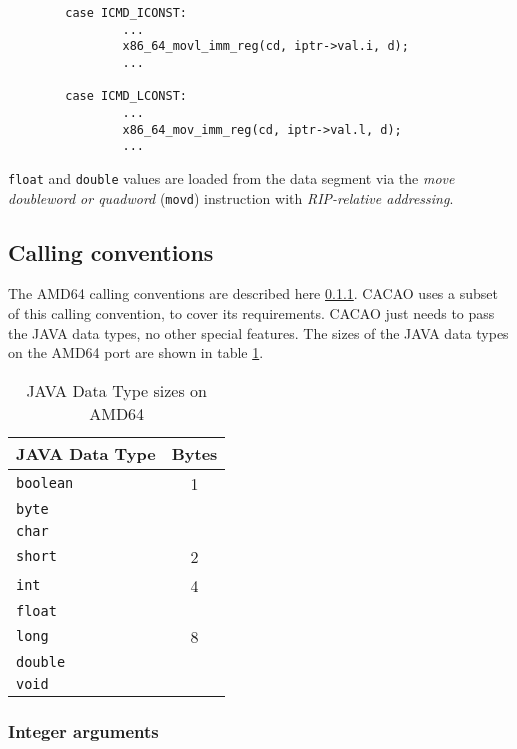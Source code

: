 \begin{verbatim}
        case ICMD_ICONST:
                ...
                x86_64_movl_imm_reg(cd, iptr->val.i, d);
                ...

        case ICMD_LCONST:
                ...
                x86_64_mov_imm_reg(cd, iptr->val.l, d);
                ...
\end{verbatim}

\texttt{float} and \texttt{double} values are loaded from the data
segment via the \textit{move doubleword or quadword} (\texttt{movd})
instruction with \textit{RIP-relative addressing}.


\subsection{Calling conventions}

The AMD64 calling conventions are described here \ref{}. CACAO uses a
subset of this calling convention, to cover its requirements. CACAO
just needs to pass the JAVA data types, no other special features. The
sizes of the JAVA data types on the AMD64 port are shown in table
\ref{javadatatypesizes}.

\begin{table}
\begin{center}
\begin{tabular}[b]{|l|c|}
\hline
JAVA Data Type   & Bytes \\ \hline
\texttt{boolean} & 1     \\
\texttt{byte}    &       \\
\texttt{char}    &       \\ \hline
\texttt{short}   & 2     \\ \hline
\texttt{int}     & 4     \\
\texttt{float}   &       \\ \hline
\texttt{long}    & 8     \\
\texttt{double}  &       \\
\texttt{void}    &       \\ \hline
\end{tabular}
\caption{JAVA Data Type sizes on AMD64}
\label{javadatatypesizes}
\end{center}
\end{table}

\subsubsection{Integer arguments}


